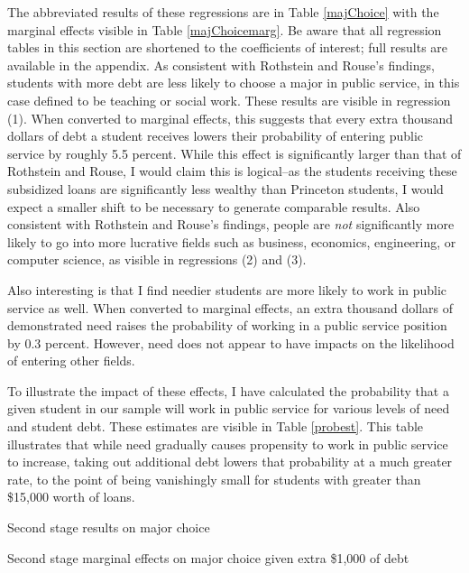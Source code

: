 \documentclass[12pt]{article}
\newcommand{\regs}{../Analysis/Regressions/Output/}
\begin{document}
	The abbreviated results of these regressions are in Table \ref{majChoice} with the marginal effects visible in Table \ref{majChoicemarg}. Be aware that all regression tables in this section are shortened to the coefficients of interest; full results are available in the appendix. As consistent with Rothstein and Rouse's findings, students with more debt are less likely to choose a major in public service, in this case defined to be teaching or social work. These results are visible in regression (1). When converted to marginal effects, this suggests that every extra thousand dollars of debt a student receives lowers their probability of entering public service by roughly 5.5 percent. While this effect is significantly larger than that of Rothstein and Rouse, I would claim this is logical--as the students receiving these subsidized loans are significantly less wealthy than Princeton students, I would expect a smaller shift to be necessary to generate comparable results. Also consistent with Rothstein and Rouse's findings, people are \emph{not} significantly more likely to go into more lucrative fields such as business, economics, engineering, or computer science, as visible in regressions (2) and (3). 
	
	Also interesting is that I find needier students are more likely to work in public service as well. When converted to marginal effects, an extra thousand dollars of demonstrated need raises the probability of working in a public service position by 0.3 percent. However, need does not appear to have impacts on the likelihood of entering other fields.
	
	To illustrate the impact of these effects, I have calculated the probability that a given student in our sample will work in public service for various levels of need and student debt. These estimates are visible in Table \ref{probest}. This table illustrates that while need gradually causes propensity to work in public service to increase, taking out additional debt lowers that probability at a much greater rate, to the point of being vanishingly small for students with greater than \$15,000 worth of loans.

	\begin{table}
		\centering
		\caption{Second stage results on major choice}	
		\resizebox{\textwidth}{!}{	
			
		}
		\label{majChoice}
	\end{table}

	\begin{table}
		\centering
		\caption{Second stage marginal effects on major choice given extra \$1,000 of debt}	
		\resizebox{\textwidth}{!}{	
			
		}
		\label{majChoicemarg}
	\end{table}
\end{document}
